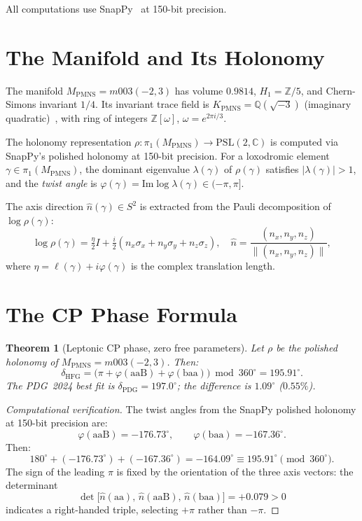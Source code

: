 \documentclass[11pt,a4paper]{article}
\newtheorem{theorem}{Theorem}
\theoremstyle{remark}
\newcommand{\MPMNS}{M_{\mathrm{PMNS}}}
\newcommand{\KPMNS}{K_{\mathrm{PMNS}}}
\newcommand{\PSL}{\mathrm{PSL}(2,\mathbb{C})}
\newcommand{\Zfive}{\mathbb{Z}/5}
\begin{document}
All computations use SnapPy~\cite{SnapPy} at 150-bit precision.

\section{The Manifold and Its Holonomy}
\label{sec:manifold}

The manifold $\MPMNS=m003(-2,3)$ has volume $0.9814$,
$H_1=\Zfive$, and Chern-Simons invariant $1/4$.
Its invariant trace field is $\KPMNS=\mathbb{Q}(\sqrt{-3})$
(imaginary quadratic)~\cite{Chinburg98}, with ring of integers
$\mathbb{Z}[\omega]$, $\omega=e^{2\pi i/3}$.

The holonomy representation $\rho:\pi_1(\MPMNS)\to\PSL$ is
computed via SnapPy's polished holonomy at 150-bit precision.
For a loxodromic element $\gamma\in\pi_1(\MPMNS)$, the dominant
eigenvalue $\lambda(\gamma)$ of $\rho(\gamma)$ satisfies
$|\lambda(\gamma)|>1$, and the \emph{twist angle} is
$\varphi(\gamma)=\mathrm{Im}\log\lambda(\gamma)\in(-\pi,\pi]$.

The axis direction $\hat{n}(\gamma)\in S^2$ is extracted from
the Pauli decomposition of $\log\rho(\gamma)$:
\[
  \log\rho(\gamma)
  = \tfrac{\eta}{2}I
  + \tfrac{i}{2}(n_x\sigma_x+n_y\sigma_y+n_z\sigma_z),
  \quad
  \hat{n}=\frac{(n_x,n_y,n_z)}{\|(n_x,n_y,n_z)\|},
\]
where $\eta=\ell(\gamma)+i\varphi(\gamma)$ is the complex
translation length.

\section{The CP Phase Formula}
\label{sec:formula}

\begin{theorem}[Leptonic CP phase, zero free parameters]
\label{thm:main}
Let $\rho$ be the polished holonomy of $\MPMNS=m003(-2,3)$.
Then:
\[
  \boxed{
    \delta_{\mathrm{HFG}}
    = \bigl(\pi + \varphi(\mathrm{aaB}) + \varphi(\mathrm{baa})\bigr)
      \bmod 360^\circ
    = 195.91^\circ.
  }
\]
The PDG~2024 best fit is $\delta_{\mathrm{PDG}}=197.0^\circ$;
the difference is $1.09^\circ$ ($0.55\%$).
\end{theorem}

\begin{proof}[Computational verification]
The twist angles from the SnapPy polished holonomy at 150-bit
precision are:
\[
  \varphi(\mathrm{aaB}) = -176.73^\circ,
  \qquad
  \varphi(\mathrm{baa}) = -167.36^\circ.
\]
Then:
\[
  180^\circ + (-176.73^\circ) + (-167.36^\circ)
  = -164.09^\circ
  \equiv 195.91^\circ \pmod{360^\circ}.
\]
The sign of the leading $\pi$ is fixed by the orientation of the
three axis vectors: the determinant
\[
  \det\bigl[\hat{n}(\mathrm{aa}),\,\hat{n}(\mathrm{aaB}),\,
  \hat{n}(\mathrm{baa})\bigr] = +0.079 > 0
\]
indicates a right-handed triple, selecting $+\pi$ rather than $-\pi$.
\end{proof}
\end{document}
